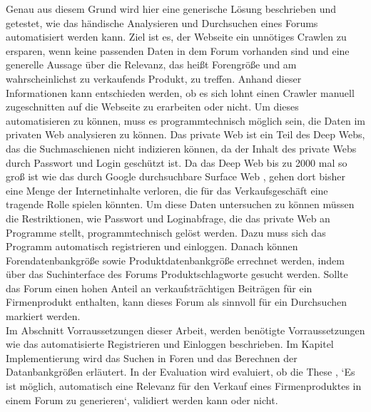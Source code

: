 Genau aus diesem Grund wird hier eine generische Lösung beschrieben und getestet, wie das händische Analysieren und Durchsuchen eines Forums automatisiert werden kann. Ziel ist es,  der Webseite ein unnötiges Crawlen zu ersparen, wenn keine passenden Daten in dem Forum vorhanden sind und eine generelle Aussage über die Relevanz, das heißt Forengröße und am wahrscheinlichst zu verkaufends Produkt, zu treffen. Anhand dieser Informationen kann entschieden werden, ob es sich lohnt einen Crawler manuell zugeschnitten auf die Webseite zu erarbeiten oder nicht.
Um dieses automatisieren zu können, muss es programmtechnisch möglich sein, die Daten im privaten Web analysieren zu können. Das private Web ist ein Teil des Deep Webs, das die Suchmaschienen nicht indizieren können, da der Inhalt des private Webs durch Passwort und Login geschützt ist. Da das Deep Web bis zu 2000 mal so groß ist wie das durch Google durchsuchbare Surface Web \cite{gupta2014comparative}, gehen dort bisher eine Menge der Internetinhalte verloren, die für das Verkaufsgeschäft eine tragende Rolle spielen könnten. Um diese Daten untersuchen zu können müssen die Restriktionen, wie Passwort und Loginabfrage, die das private Web an Programme stellt, programmtechnisch gelöst werden. Dazu muss sich das Programm automatisch registrieren und einloggen. Danach können Forendatenbankgröße sowie Produktdatenbankgröße errechnet werden, indem über das Suchinterface des Forums Produktschlagworte gesucht werden. Sollte das Forum einen hohen Anteil an verkaufsträchtigen Beiträgen für ein Firmenprodukt enthalten, kann dieses Forum als sinnvoll für ein Durchsuchen markiert werden.\\
Im Abschnitt Vorraussetzungen dieser Arbeit, werden benötigte Vorraussetzungen wie das automatisierte Registrieren und Einloggen beschrieben.  Im Kapitel Implementierung wird das Suchen in Foren und das Berechnen der Datanbankgrößen erläutert. In der Evaluation wird evaluiert, ob die These , `Es ist möglich, automatisch eine Relevanz für den Verkauf eines Firmenproduktes in einem Forum zu generieren`, validiert werden kann oder nicht.
\newpage